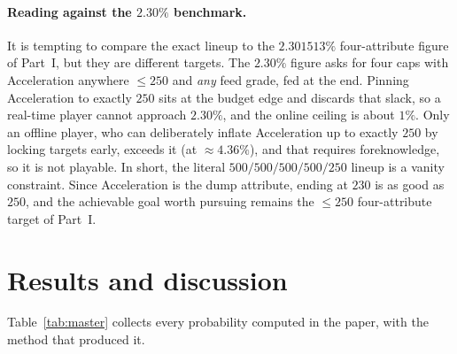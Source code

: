 \documentclass[11pt]{article}
\theoremstyle{remark}
\begin{document}
\paragraph{Reading against the $2.30\%$ benchmark.}
It is tempting to compare the exact lineup to the $2.301513\%$ four-attribute figure
of Part~I, but they are different targets. The $2.30\%$ figure asks for four caps with
Acceleration anywhere $\le 250$ and \emph{any} feed grade, fed at the end. Pinning
Acceleration to exactly $250$ sits at the budget edge and discards that slack, so a
real-time player cannot approach $2.30\%$, and the online ceiling is about $1\%$. Only
an offline player, who can deliberately inflate Acceleration up to exactly $250$ by
locking targets early, exceeds it (at $\approx 4.36\%$), and that requires
foreknowledge, so it is not playable. In short, the literal $500/500/500/500/250$
lineup is a vanity constraint. Since Acceleration is the dump attribute, ending at
$230$ is as good as $250$, and the achievable goal worth pursuing remains the
$\le 250$ four-attribute target of Part~I.

\section{Results and discussion}\label{sec:results}

Table~\ref{tab:master} collects every probability computed in the paper, with the
method that produced it.
\end{document}
